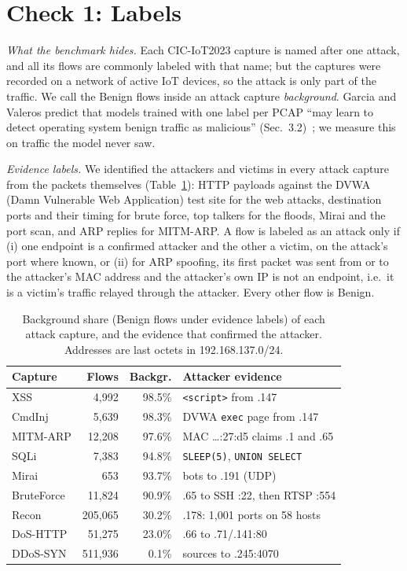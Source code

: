 \section{Check 1: Labels}\label{sec:labels}

\emph{What the benchmark hides.} Each CIC-IoT2023 capture is named after one attack, and all its flows are commonly labeled with that name; but the captures were recorded on a network of active IoT devices, so the attack is only part of the traffic. We call the Benign flows inside an attack capture \emph{background}. Garcia and Valeros predict that models trained with one label per PCAP ``may learn to detect operating system benign traffic as malicious'' (Sec.~3.2)~\cite{garcia2023labeling}; we measure this on traffic the model never saw.

\emph{Evidence labels.} We identified the attackers and victims in every attack capture from the packets themselves (Table~\ref{tab:background}): HTTP payloads against the DVWA (Damn Vulnerable Web Application) test site for the web attacks, destination ports and their timing for brute force, top talkers for the floods, Mirai and the port scan, and ARP replies for MITM-ARP. A flow is labeled as an attack only if (i) one endpoint is a confirmed attacker and the other a victim, on the attack's port where known, or (ii) for ARP spoofing, its first packet was sent from or to the attacker's MAC address and the attacker's own IP is not an endpoint, i.e.\ it is a victim's traffic relayed through the attacker. Every other flow is Benign.

\begin{table}[t]
\centering
\caption{Background share (Benign flows under evidence labels) of each attack capture, and the evidence that confirmed the attacker. Addresses are last octets in 192.168.137.0/24.}
\label{tab:background}
\footnotesize
\setlength{\tabcolsep}{3pt}
\begin{tabular}{lrr>{\raggedright\arraybackslash}p{3.85cm}}
\toprule
Capture & Flows & Backgr. & Attacker evidence \\
\midrule
XSS          &   4,992 & 98.5\% & \texttt{<script>} from .147 \\
CmdInj       &   5,639 & 98.3\% & DVWA \texttt{exec} page from .147 \\
MITM-ARP     &  12,208 & 97.6\% & MAC \ldots:27:d5 claims .1 and .65 \\
SQLi         &   7,383 & 94.8\% & \texttt{SLEEP(5)}, \texttt{UNION SELECT} \\
Mirai        &     653 & 93.7\% & 7 bots to .191 (UDP) \\
BruteForce   &  11,824 & 90.9\% & .65 to SSH :22, then RTSP :554 \\
Recon        & 205,065 & 30.2\% & .178: 1,001 ports on 58 hosts \\
DoS-HTTP     &  51,275 & 23.0\% & .66 to .71/.141:80 \\
DDoS-SYN     & 511,936 &  0.1\% & 6 sources to .245:4070 \\
\bottomrule
\end{tabular}
\end{table}

